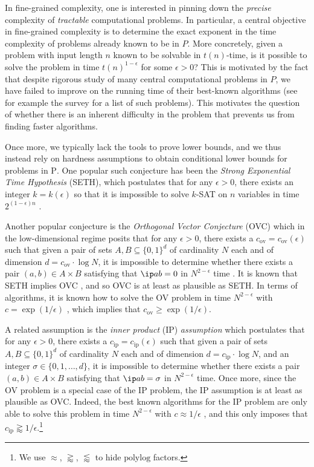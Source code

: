 \documentclass[11pt]{article}
\theoremstyle{plain}
\theoremstyle{remark}
\newcommand{\polytime}{\mathrm{P}}
\newcommand{\iP}{\mathrm{ip}}
\newcommand{\ov}{\mathrm{ov}}
\newcommand{\polylog}{\mathrm{polylog}}
\begin{document}
In fine-grained complexity, one is interested in pinning down the  \emph{precise} complexity
of \emph{tractable} computational problems. In particular, a central objective in fine-grained complexity is to 
determine the exact exponent  in the time complexity of
 problems already known to be in $P$. More concretely, given a problem with input length $n$ known
to be solvable in $t(n)$-time, is it possible to solve the problem 
in time $t(n)^{1-\epsilon}$  for some $\epsilon>0$?
 This is  motivated by the fact that despite rigorous study of many central
computational problems in $P$, we have failed to improve on the running time of their best-known algorithms (see for example the survey \cite{Wil18} for a list of such problems). This motivates the question of whether there is an inherent difficulty in the problem that prevents us from finding faster algorithms.

Once more, we typically lack the tools to prove lower bounds, and we  thus instead rely on hardness assumptions to obtain conditional lower bounds for problems in $\polytime$.
One popular such conjecture has been the \emph{Strong Exponential Time Hypothesis} (SETH), which postulates that for any $\epsilon>0$, there exists an integer $k=k(\epsilon)$ so that
it is impossible to solve $k$-SAT on $n$ variables  in time  $2^{(1-\epsilon)n}$ \cite{IP01}.

Another popular conjecture is the \emph{Orthogonal Vector Conjecture} (OVC) which in the low-dimensional regime posits that for any $\epsilon>0$, there exists a $c_{\ov}= c_{\ov}(\epsilon)$ such that given a pair of sets $A,B\subseteq\{0,1\}^{d}$ of cardinality $N$ each and of dimension $d = c_{\ov} \cdot \log N$,  it is impossible to determine whether there exists a pair $(a,b)\in A\times B$
satisfying that $\ip a b=0$ in $N^{2-\epsilon}$ time \cite{GIKW19}. It is known that  SETH implies OVC \cite{Wil05}, and so OVC is at least as plausible as SETH. In terms of algorithms, it is known how to solve the OV problem in time $N^{2-\epsilon}$ with $c = \exp(1/\epsilon)$ \cite{AWY15, CW21}, which implies that $c_{\ov} \geq \exp(1/\epsilon)$.

A related assumption is the \emph{inner product} (IP) \emph{assumption} which postulates that for any $\epsilon>0$, there exists a $c_{\iP}= c_{\iP}(\epsilon)$ such that given a pair of sets $A,B\subseteq\{0,1\}^{d}$ of cardinality $N$ each and of dimension $d = c_{\iP} \cdot \log N$, and an integer $\sigma \in \{0,1,\ldots,d\}$,  it is impossible to determine whether there exists a pair $(a,b)\in A\times B$
satisfying that $\ip a b=\sigma$ in $N^{2-\epsilon}$ time. Once more, since the OV problem is a special case of the IP problem, the IP assumption is at least as plausible as OVC. Indeed, the best known algorithms for the IP problem are only able to solve this problem in time $N^{2-\epsilon}$ with $c \approx 1/\epsilon$ \cite{AW15}, and this only imposes that $c_{\iP} \gtrapprox  1/\epsilon$.\footnote{We use $\approx$, $\gtrapprox$, $\lessapprox$ to hide $\polylog$ factors.} 
 
\end{document}
